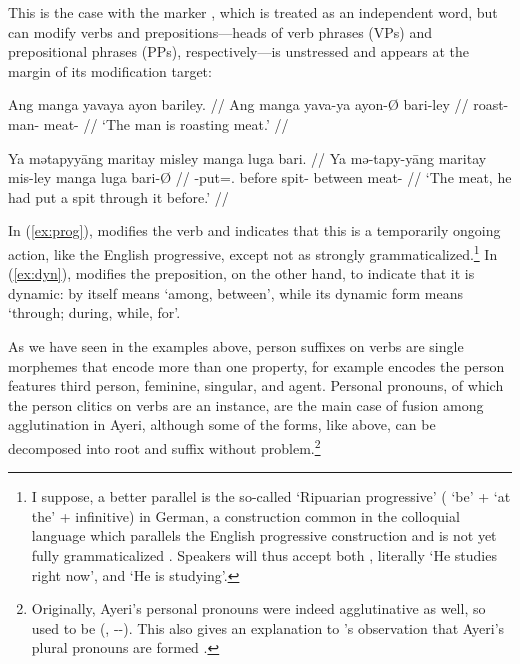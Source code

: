 This is the case with the marker , which is treated as an 
independent word, but can modify verbs and prepositions---heads of verb 
phrases (VPs) and prepositional phrases (PPs), respectively---is unstressed and 
appears at the margin of its modification target:

\pex
\a\label{ex:prog}\begingl
	\gla Ang manga yavaya ayon bariley. //
	\glb Ang manga yava-ya ayon-Ø bari-ley //
	\glc \AgtT{} \Prog{} roast-\TsgM{} man-\Top{} meat-\PargI{} //
	\glft `The man is roasting meat.' //
\endgl

\a\label{ex:dyn}\begingl
	\gla Ya mətapyyāng maritay misley manga luga bari. //
	\glb Ya mə-tapy-yāng maritay mis-ley manga luga bari-Ø //
	\glc \LocT{} \Pst{}-put=\TsgM{}.\Aarg{} before spit-\PargI{} \Dyn{} 
		between meat-\Top{} //
	\glft `The meat, he had put a spit through it before.' //
\endgl

\xe

In (\ref{ex:prog}),  modifies the verb  
and indicates that this is a temporarily ongoing action, like the English 
progressive, except not as strongly grammaticalized.\footnote{I suppose, a 
better parallel is the so-called  `Ripuarian 
progressive' ( `be' +  `at the' + infinitive) in German, a 
construction common in the colloquial language which parallels the English 
progressive construction and is not yet fully grammaticalized 
\citep[435]{dudengram2016}. Speakers will thus accept both , literally `He studies right now', and  `He is 
studying'.
% 
}
%
In (\ref{ex:dyn}),  modifies the preposition, on the other 
hand, to indicate that it is dynamic:  by itself means `among, 
between', while its dynamic form  means `through; 
during, while, for'.

As we have seen in the examples above, person suffixes on verbs are single 
morphemes that encode more than one property, for example  
encodes the person features third person, feminine, singular, and agent. 
Personal pronouns, of which the person clitics on 
verbs are an instance, are the main case of fusion among agglutination in 
Ayeri, although some of the forms, like  above, can 
be decomposed into root and suffix without problem.\footnote{Originally, 
Ayeri's personal pronouns were indeed agglutinative as well, so 
 used to be  (, 
\Tsg{}-\F{}-\Aarg{}). This also gives an explanation to \citet{boga2016}'s 
observation that Ayeri's plural pronouns are formed .}

